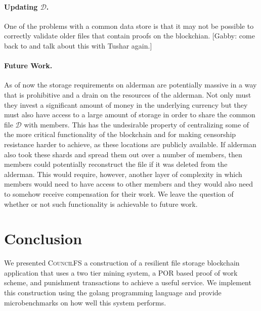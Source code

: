 \documentclass{article}
\begin{document}
\paragraph{Updating $\mathcal{D}$.}
One of the problems with a common data store is that it may not be possible to correctly validate older files that contain proofs on the blockchian. [Gabby: come back to and talk about this with Tushar again.]

\paragraph{Future Work.}
As of now the storage requirements on alderman are potentially massive in a way that is prohibitive and a drain on the resources of the alderman. Not only must they invest a significant amount of money in the underlying currency but they must also have access to a large amount of storage in order to share the common file $\mathcal{D}$ with members. This has the undesirable property of centralizing some of the more critical functionality of the blockchain and for making censorship resistance harder to achieve, as these locations are publicly available. If alderman also took these shards and spread them out over a number of members, then members could potentially reconstruct the file if it was deleted from the alderman. This would require, however, another layer of complexity in which members would need to have access to other members and they would also need to somehow receive compensation for their work. We leave the question of whether or not such functionality is achievable to future work. 

\section{Conclusion}
We presented \textsc{CouncilFS} a construction of a resilient file storage blockchain application that uses a two tier mining system, a POR based proof of work scheme, and punishment transactions to achieve a useful service. We implement this construction using the golang programming language and provide microbenchmarks on how well this system performs.







  

\end{document}
